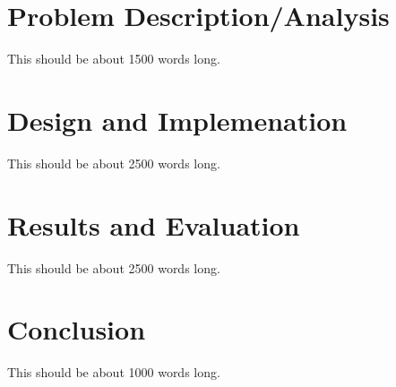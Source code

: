 \documentclass[authoryearcitations]{UoYCSproject}
\begin{document}
\chapter{Problem Description/Analysis}
\label{cha:Problem Description}
This should be about 1500 words long.

\chapter{Design and Implemenation}
\label{cha:Design and Implementation}
This should be about 2500 words long.

\chapter{Results and Evaluation}
\label{cha:Results and Evaluation}
This should be about 2500 words long.

\chapter{Conclusion}
\label{cha:Conclusion}
This should be about 1000 words long.


 
\end{document}
